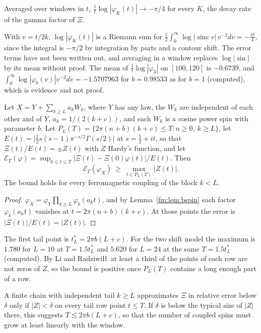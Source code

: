 \begin{proposition}[heuristic]\label{fm:prop:rate}
Averaged over windows in $t$, $\frac1t\log|\varphi_K(t)|\to-\pi/4$ for every $K$, the decay rate of the gamma factor of $\Xi$.
\end{proposition}

With $v=t/2k$, $\log|\varphi_K(t)|$ is a Riemann sum for $\frac t2\int_0^\infty\log|\operatorname{sinc}v|\,v^{-2}dv=-\frac{\pi t}4$, since the integral is $-\pi/2$ by integration by parts and a contour shift. The error terms have not been written out, and averaging in a window replaces $\log|\sin|$ by its mean without proof. The mean of $\frac1t\log|\varphi_3|$ on $[100,120]$ is $-0.6739$, and $\int_0^\infty\log|\varphi_b(v)|v^{-2}dv=-1.5707963$ for $b=0.98533$ as for $b=1$ (computed), which is evidence and not proof.

\begin{theorem}[proved]\label{fm:thm:rowbound}
Let $X=Y+\sum_{k\ge L}a_kW_k$, where $Y$ has any law, the $W_k$ are independent of each other and of $Y$, $a_k=1/(2(k+c))$, and each $W_k$ is a cosine power spin with parameter $b$. Let $P_L(T)=\{2\pi(n+b)(k+c)\le T:n\ge0,\ k\ge L\}$, let $E(t)=\big|\frac12s(s-1)\pi^{-s/2}\Gamma(s/2)\big|$ at $s=\frac12+it$, so that $\Xi(t)/E(t)=\pm Z(t)$ with $Z$ Hardy's function, and let $\mathcal E_T(\varphi)=\sup_{0\le t\le T}|\Xi(t)-\Xi(0)\varphi(t)|/E(t)$. Then
\[
\mathcal E_T(\varphi_X)\ \ge\ \max_{t\in P_L(T)}|Z(t)| .
\]
The bound holds for every ferromagnetic coupling of the block $k<L$.
\end{theorem}

\begin{proof}
$\varphi_X=\varphi_Y\prod_{k\ge L}\varphi_b(a_kt)$, and by Lemma~\ref{fm:lem:bspin} each factor $\varphi_b(a_kt)$ vanishes at $t=2\pi(n+b)(k+c)$. At those points the error is $|\Xi(t)|/E(t)=|Z(t)|$.
\end{proof}

The first tail point is $t^*_L=2\pi b(L+c)$. For the two shift model the maximum is $1.780$ for $L=10$ at $T=1.5t^*_L$ and $5.620$ for $L=24$ at the same $T=1.5t^*_L$ (computed). By Li and Radziwi\l\l\ at least a third of the points of each row are not zeros of $Z$, so the bound is positive once $P_L(T)$ contains a long enough part of a row.

\begin{remark}[heuristic]\label{fm:rem:linear}
A finite chain with independent tail $k\ge L$ approximates $\Xi$ in relative error below $\delta$ only if $|Z|<\delta$ on every tail row point $t\le T$. If $\delta$ is below the typical size of $|Z|$ there, this suggests $T\lesssim2\pi b(L+c)$, so that the number of coupled spins must grow at least linearly with the window.
\end{remark}

